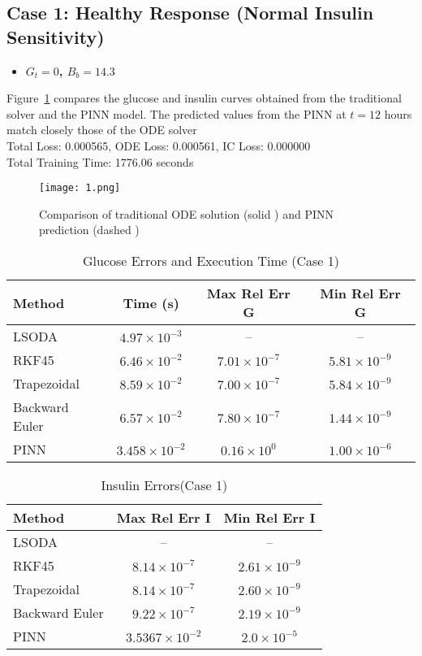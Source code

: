 \documentclass[conference]{IEEEtran}
\begin{document}
\subsection{Case 1: Healthy Response (Normal Insulin Sensitivity)}
\begin{itemize}
\item \textbf{ $G_t = 0$, $B_b = 14.3$} \\
\end{itemize}
Figure~\ref{fig:case1_glucose_insulin} compares the glucose and insulin curves obtained from the traditional solver and the PINN model. The predicted values from the PINN at \(t=12\) hours match closely those of the ODE solver\\
Total Loss: 0.000565, ODE Loss: 0.000561, IC Loss: 0.000000\\
Total Training Time:   1776.06 seconds

\begin{figure}[htbp]
    \centering
    \texttt{[image: 1.png]}
    \caption{Comparison of traditional ODE solution (solid ) and PINN prediction (dashed )}
    \label{fig:case1_glucose_insulin}
\end{figure}
\vspace{-0.7cm}

\begin{table}[H]
\centering
\caption{Glucose Errors and Execution Time (Case 1)}
\begin{tabular}{|l|c|c|c|}
\hline
\textbf{Method} & \textbf{Time (s)} & \textbf{Max Rel Err G} & \textbf{Min Rel Err G} \\
\hline
LSODA & $4.97 \times 10^{-3}$ & -- & -- \\
RKF45 & $6.46 \times 10^{-2}$ & $7.01 \times 10^{-7}$ & $5.81 \times 10^{-9}$ \\
Trapezoidal & $8.59 \times 10^{-2}$ & $7.00 \times 10^{-7}$ & $5.84 \times 10^{-9}$ \\
Backward Euler & $6.57 \times 10^{-2}$ & $7.80 \times 10^{-7}$ & $1.44 \times 10^{-9}$ \\
PINN & $3.458 \times 10^{-2}$ & $0.16 \times 10^{0}$ & $1.00 \times 10^{-6}$ \\
\hline
\end{tabular}
\end{table}
\vspace{-0.7cm}

\begin{table}[H]
\centering
\caption{Insulin Errors(Case 1)}
\begin{tabular}{|l|c|c|}
\hline
\textbf{Method} &  \textbf{Max Rel Err I} & \textbf{Min Rel Err I} \\
\hline
LSODA & -- & -- \\
RKF45 & $8.14 \times 10^{-7}$ & $2.61 \times 10^{-9}$ \\
Trapezoidal& $8.14 \times 10^{-7}$ & $2.60 \times 10^{-9}$ \\
Backward Euler  & $9.22 \times 10^{-7}$ & $2.19 \times 10^{-9}$ \\
PINN  & $3.5367 \times 10^{-2}$ & $2.0 \times 10^{-5}$ \\
\hline
\end{tabular}
\end{table}
\end{document}
